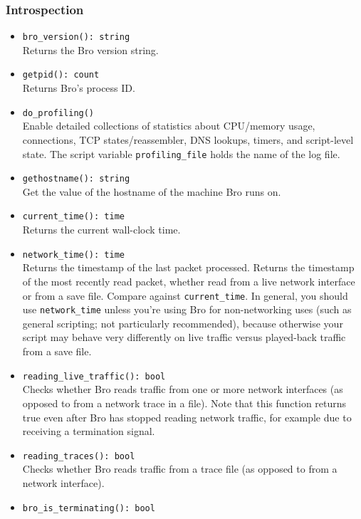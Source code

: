 \documentclass[10pt,landscape]{article}
\begin{document}
\begin{multicols*}{2}
\subsubsection*{Introspection}

\begin{itemize}
  \item \verb|bro_version(): string|\\
    Returns the Bro version string.
  \item \verb|getpid(): count|\\
    Returns Bro's process ID.
  \item \verb|do_profiling()|\\
    Enable detailed collections of statistics about CPU/memory usage,
    connections, TCP states/reassembler, DNS lookups, timers, and script-level
    state. The script variable \verb|profiling_file| holds the name of the log
    file.
  \item \verb|gethostname(): string|\\
    Get the value of the hostname of the machine Bro runs on.
  \item \verb|current_time(): time|\\
    Returns the current wall-clock time.
  \item \verb|network_time(): time|\\
    Returns the timestamp of the last packet processed.
    Returns the timestamp of the most recently read packet, whether read from a
    live network interface or from a save file. Compare against
    \verb|current_time|. In general, you should use \verb|network_time| unless
    you're using Bro for non-networking uses (such as general scripting; not
    particularly recommended), because otherwise your script may behave very
    differently on live traffic versus played-back traffic from a save file.
  \item \verb|reading_live_traffic(): bool|\\
    Checks whether Bro reads traffic from one or more network interfaces (as
    opposed to from a network trace in a file). Note that this function returns
    true even after Bro has stopped reading network traffic, for example due to
    receiving a termination signal.
  \item \verb|reading_traces(): bool|\\
    Checks whether Bro reads traffic from a trace file (as opposed to
    from a network interface).
  \item \verb|bro_is_terminating(): bool|\\

\end{itemize}
\end{multicols*}
\end{document}
